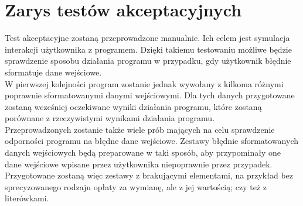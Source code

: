 \documentclass[a4paper,12pt]{article}
\newcommand\tab[1][0.6cm]{\hspace*{#1} }
\begin{document}
\section{Zarys testów akceptacyjnych}

\tab Test akceptacyjne zostaną przeprowadzone manualnie. Ich celem jest symulacja interakcji użytkownika z programem. Dzięki takiemu testowaniu możliwe będzie sprawdzenie sposobu działania programu w przypadku, gdy użytkownik błędnie sformatuje dane wejściowe. \\W pierwszej kolejności program zostanie jednak wywołany z kilkoma różnymi poprawnie sformatowanymi danymi wejściowymi. Dla tych danych przygotowane zostaną wcześniej oczekiwane wyniki działania programu, które zostaną porównane z rzeczywistymi wynikami działania programu. 
\\\tab Przeprowadzonych zostanie także wiele prób mających na celu sprawdzenie odporności programu na błędne dane wejściowe. Zestawy błędnie sformatowanych danych wejściowych będą preparowane w taki sposób, aby przypominały one dane wejściowe wpisane przez użytkownika niepoprawnie przez przypadek. Przygotowane zostaną więc zestawy z brakującymi elementami, na przykład bez sprecyzowanego rodzaju opłaty za wymianę, ale z jej wartością; czy też z literówkami. 
\end{document}
